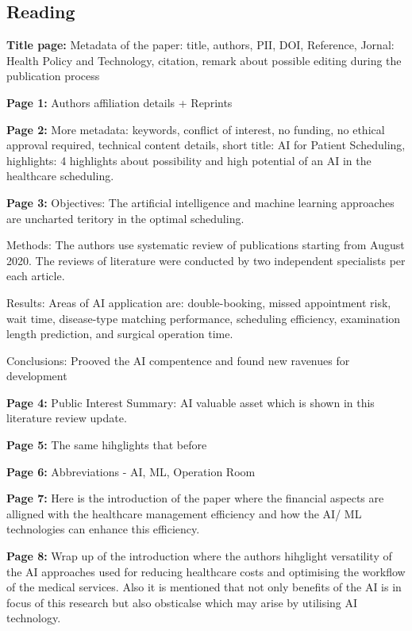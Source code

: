 \subsection{Reading}

    \textbf{Title page:}
    Metadata of the paper: title, authors, PII, DOI, Reference, Jornal: Health Policy and Technology, citation, remark about possible editing during the publication process

    \textbf{Page 1:}
    Authors affiliation details + Reprints
    
    \textbf{Page 2:}
    More metadata: keywords, conflict of interest, no funding, no ethical approval required, technical content details, short title: AI for Patient Scheduling, highlights: 4 highlights about possibility and high potential of an AI in the healthcare scheduling.
    
    \textbf{Page 3:}
    Objectives: The artificial intelligence and machine learning approaches are uncharted teritory in the optimal scheduling.

    Methods: The authors use systematic review of publications starting from August 2020. The reviews of literature were conducted by two independent specialists per each article.

    Results: Areas of AI application are: double-booking, missed appointment risk, wait time, disease-type matching performance, scheduling efficiency, examination length prediction, and surgical operation time.

    Conclusions: Prooved the AI compentence and found new ravenues for development

    \textbf{Page 4:}
    Public Interest Summary: AI valuable asset which is shown in this literature review update.

    \textbf{Page 5:}
    The same hihglights that before

    \textbf{Page 6:}
    Abbreviations - AI, ML, Operation Room

    \textbf{Page 7:}
    Here is the introduction of the paper where the financial aspects are alligned with the healthcare management efficiency and how the AI/ ML technologies can enhance this efficiency.

    \textbf{Page 8:}
    Wrap up of the introduction where the authors hihglight versatility of the AI approaches used for reducing healthcare costs and optimising the workflow of the medical services. Also it is mentioned that not only benefits of the AI is in focus of this research but also obsticalse which may arise by utilising AI technology.

